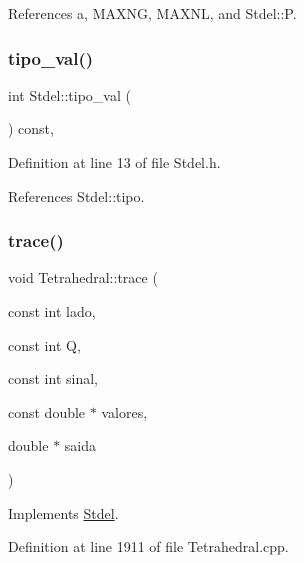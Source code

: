 References a, M\+A\+X\+NG, M\+A\+X\+NL, and Stdel\+::P.

\mbox{\label{classStdel_a75023fc369db2752845a9ce278f10929}} 
\subsubsection{\texorpdfstring{tipo\+\_\+val()}{tipo\_val()}}
{\footnotesize\ttfamily int Stdel\+::tipo\+\_\+val (\begin{DoxyParamCaption}{ }\end{DoxyParamCaption}) const\hspace{0.3cm}{\ttfamily [inline]}, {\ttfamily [inherited]}}



Definition at line 13 of file Stdel.\+h.



References Stdel\+::tipo.

\mbox{\label{classTetrahedral_af069ebbab2d2cc329ff5bc26ad914e4e}} 
\subsubsection{\texorpdfstring{trace()}{trace()}}
{\footnotesize\ttfamily void Tetrahedral\+::trace (\begin{DoxyParamCaption}\item[{const int}]{lado,  }\item[{const int}]{Q,  }\item[{const int}]{sinal,  }\item[{const double $\ast$}]{valores,  }\item[{double $\ast$}]{saida }\end{DoxyParamCaption})\hspace{0.3cm}{\ttfamily [virtual]}}



Implements \hyperlink{classStdel_aeb2fe03bbd8af61e503e29d3dd5ae4f0}{Stdel}.



Definition at line 1911 of file Tetrahedral.\+cpp.

\mbox{\label{classTetrahedral_aff4e988560d3b0206b95d13d6b7e795b}} 
